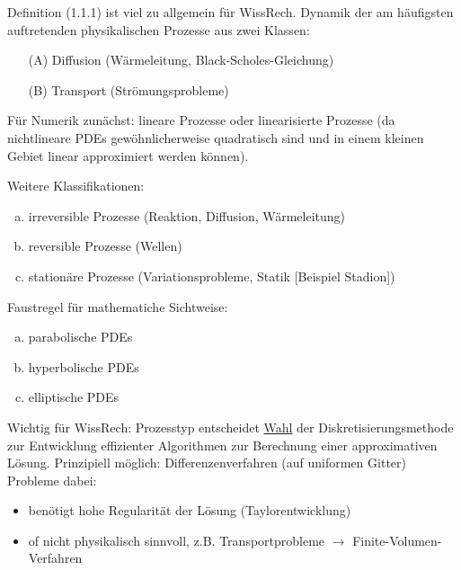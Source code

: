 Definition (1.1.1) ist viel zu allgemein für WissRech. Dynamik der am häufigsten auftretenden physikalischen Prozesse aus zwei Klassen: 
\begin{enumerate}
    \item[(A)] Diffusion (Wärmeleitung, Black-Scholes-Gleichung)
    \item[(B)] Transport (Strömungsprobleme)
\end{enumerate}
Für Numerik zunächst: lineare Prozesse oder linearisierte Prozesse (da nichtlineare PDEs gewöhnlicherweise quadratisch sind und in einem kleinen Gebiet linear approximiert werden können).

Weitere Klassifikationen:
\begin{enumerate}[(a)]
    \item irreversible Prozesse (Reaktion, Diffusion, Wärmeleitung)
    \item reversible Prozesse (Wellen)
    \item stationäre Prozesse (Variationsprobleme, Statik [Beispiel Stadion])
\end{enumerate}

Faustregel für mathematiche Sichtweise:
\begin{enumerate}[(a) $\to$]
    \item parabolische PDEs
    \item hyperbolische PDEs
    \item elliptische PDEs
\end{enumerate}

Wichtig für WissRech: Prozesstyp entscheidet \underline{Wahl} der Diskretisierungsmethode zur Entwicklung effizienter Algorithmen zur Berechnung einer approximativen Lösung.
Prinzipiell möglich: Differenzenverfahren (auf uniformen Gitter)
Probleme dabei: 
\begin{itemize}
    \item benötigt hohe Regularität der Lösung (Taylorentwicklung)
        \item of nicht physikalisch sinnvoll, z.B. Transportprobleme $\to$ Finite-Volumen-Verfahren
\end{itemize}

